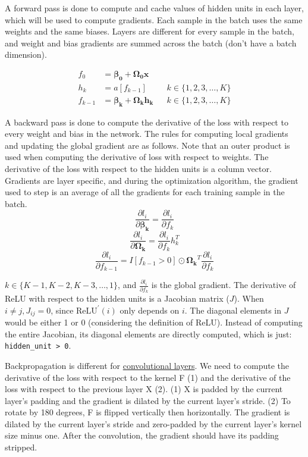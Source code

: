 \documentclass{article}
\begin{document}
A forward pass is done to compute and cache values of hidden units in each layer, which will be used to compute gradients. Each sample in the batch uses the same weights and the same biases.
Layers are different for every sample in the batch, and weight and bias gradients are summed across the batch (don't have a batch dimension).

\begin{align*}
f_0       &= \boldsymbol{\beta_0} + \boldsymbol{\Omega_0}\mathbf{x}\\
h_k       &= a[f_{k - 1}] && k \in \{1, 2, 3, \dots, K\}\\
f_{k - 1} &= \boldsymbol{\beta_k} + \boldsymbol{\Omega_k} \mathbf{h_k} && k \in \{1, 2, 3, \dots, K\}
\end{align*}

A backward pass is done to compute the derivative of the loss with respect to every weight and bias in the network. The rules for computing local gradients and updating the global gradient are as follows. Note that an outer product is used when computing the derivative of loss with respect to weights. The derivative of the loss with respect to the hidden units is a column vector. Gradients are layer specific, and during the optimization algorithm, the gradient used to step is an average of all the gradients for each training sample in the batch.
\[ \frac{\partial l_i}{\partial \boldsymbol{\beta_k}} = \frac{\partial l_i}{\partial f_k} \]
\[ \frac{\partial l_i}{\partial \boldsymbol{\Omega_k}} = \frac{\partial l_i}{\partial f_k} h_k^T \]
\[ \frac{\partial l_i}{\partial f_{k - 1}} = I[f_{k - 1} > 0] \odot \boldsymbol{\Omega_k}^T \frac{\partial l_i}{\partial f_k} \]

$k \in \{K - 1, K - 2, K - 3, \dots, 1\}$, and $\frac{\partial l_i}{\partial f_k}$ is the global gradient. The derivative of ReLU with respect to the hidden units is a Jacobian matrix ($J$). When $i \neq j, J_{ij} = 0$, since $\text{ReLU}^{\prime}(i)$ only depends on $i$. The diagonal elements in $J$ would be either 1 or 0 (considering the definition of ReLU). Instead of computing the entire Jacobian, its diagonal elements are directly computed, which is just: \texttt{hidden\_unit > 0}.

Backpropagation is different for \href{https://deeplearning.cs.cmu.edu/F21/document/recitation/Recitation5/CNN_Backprop_Recitation_5_F21.pdf}{convolutional layers}. We need to compute the derivative of the loss with respect to the kernel F (1) and the derivative of the loss with respect to the previous layer X (2).
(1) X is padded by the current layer's padding and the gradient is dilated by the current layer's stride.
(2) To rotate by 180 degrees, F is flipped vertically then horizontally. The gradient is dilated by the current layer's stride and zero-padded by the current layer's kernel size minus one. After the convolution, the gradient should have its padding stripped.
\end{document}

